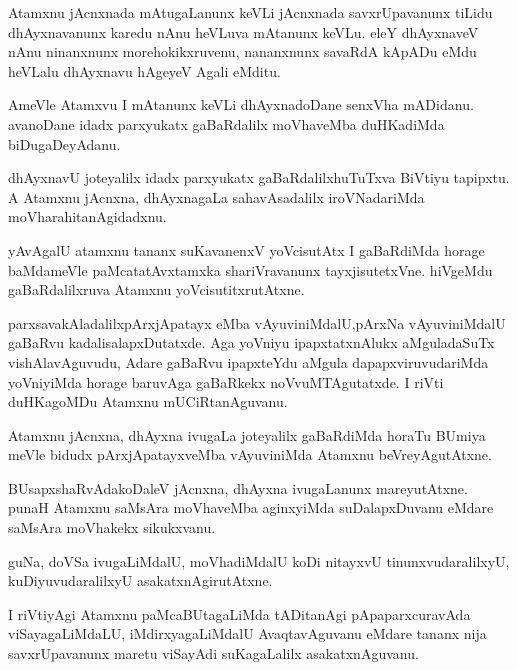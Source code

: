 \documentclass{article}
\begin{document}
\begin{mn}
Atamxnu jAcnxnada mAtugaLanunx keVLi jAcnxnada savxrUpavanunx tiLidu 
dhAyxnavanunx karedu nAnu heVLuva mAtanunx keVLu.  eleY dhAyxnaveV nAnu 
ninanxnunx morehokikxruvenu, nananxnunx savaRdA kApADu eMdu heVLalu dhAyxnavu 
hAgeyeV Agali eMditu.
\end{mn}

\begin{mn}
AmeVle Atamxvu  I mAtanunx keVLi dhAyxnadoDane senxVha mADidanu.  avanoDane 
idadx parxyukatx gaBaRdalilx moVhaveMba  duHKadiMda biDugaDeyAdanu.
\end{mn}

\begin{mn}
dhAyxnavU joteyalilx idadx parxyukatx gaBaRdalilxhuTuTxva BiVtiyu tapipxtu. 
 A Atamxnu jAcnxna, dhAyxnagaLa sahavAsadalilx iroVNadariMda moVharahitanAgidadxnu.
\end{mn}

\begin{mn}
yAvAgalU atamxnu tananx suKavanenxV yoVcisutAtx I gaBaRdiMda horage baMdameVle 
paMcatatAvxtamxka shariVravanunx tayxjisutetxVne. hiVgeMdu gaBaRdalilxruva
Atamxnu yoVcisutitxrutAtxne.
\end{mn}

\begin{mn}
parxsavakAladalilxpArxjApatayx eMba vAyuviniMdalU,pArxNa vAyuviniMdalU
gaBaRvu kadalisalapxDutatxde. Aga yoVniyu ipapxtatxnAlukx aMguladaSuTx
vishAlavAguvudu,  Adare gaBaRvu ipapxteYdu aMgula dapapxviruvudariMda
yoVniyiMda horage baruvAga gaBaRkekx noVvuMTAgutatxde. I riVti duHKagoMDu
Atamxnu mUCiRtanAguvanu.
\end{mn}

\begin{mn}
Atamxnu jAcnxna, dhAyxna ivugaLa joteyalilx  gaBaRdiMda horaTu BUmiya meVle 
 bidudx pArxjApatayxveMba vAyuviniMda Atamxnu beVreyAgutAtxne.
\end{mn}

\begin{mn}
BUsapxshaRvAdakoDaleV jAcnxna, dhAyxna ivugaLanunx mareyutAtxne. punaH 
Atamxnu saMsAra moVhaveMba aginxyiMda suDalapxDuvanu eMdare saMsAra
 moVhakekx sikukxvanu.  
\end{mn}

\begin{mn}
guNa, doVSa ivugaLiMdalU, moVhadiMdalU koDi nitayxvU tinunxvudaralilxyU,
 kuDiyuvudaralilxyU asakatxnAgirutAtxne.
 \end{mn}

\begin{mn}
I riVtiyAgi Atamxnu paMcaBUtagaLiMda tADitanAgi pApaparxcuravAda  viSayagaLiMdaLU,
 iMdirxyagaLiMdalU AvaqtavAguvanu eMdare tananx nija savxrUpavanunx maretu
 viSayAdi suKagaLalilx asakatxnAguvanu.
\end{mn}
\end{document}
